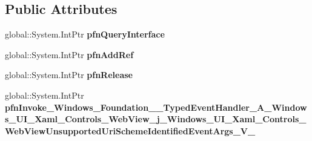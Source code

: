 \subsection*{Public Attributes}
\begin{DoxyCompactItemize}
\item 
\mbox{\label{struct_windows_1_1_foundation_1_1_typed_event_handler___a___windows___u_i___xaml___controls___we2ca8d6ce2726bd3be0205817ae158dc8_afb555e595eb9b78cb88b82047df93e94}} 
global\+::\+System.\+Int\+Ptr {\bfseries pfn\+Query\+Interface}
\item 
\mbox{\label{struct_windows_1_1_foundation_1_1_typed_event_handler___a___windows___u_i___xaml___controls___we2ca8d6ce2726bd3be0205817ae158dc8_a9399feb63f1b2ff0fb952a8736586317}} 
global\+::\+System.\+Int\+Ptr {\bfseries pfn\+Add\+Ref}
\item 
\mbox{\label{struct_windows_1_1_foundation_1_1_typed_event_handler___a___windows___u_i___xaml___controls___we2ca8d6ce2726bd3be0205817ae158dc8_acbcf840f60b1044c36b75ff25e34713b}} 
global\+::\+System.\+Int\+Ptr {\bfseries pfn\+Release}
\item 
\mbox{\label{struct_windows_1_1_foundation_1_1_typed_event_handler___a___windows___u_i___xaml___controls___we2ca8d6ce2726bd3be0205817ae158dc8_ad56f336157ca89d6d25200a9dfd1640b}} 
global\+::\+System.\+Int\+Ptr {\bfseries pfn\+Invoke\+\_\+\+Windows\+\_\+\+Foundation\+\_\+\+\_\+\+Typed\+Event\+Handler\+\_\+\+A\+\_\+\+Windows\+\_\+\+U\+I\+\_\+\+Xaml\+\_\+\+Controls\+\_\+\+Web\+View\+\_\+j\+\_\+\+Windows\+\_\+\+U\+I\+\_\+\+Xaml\+\_\+\+Controls\+\_\+\+Web\+View\+Unsupported\+Uri\+Scheme\+Identified\+Event\+Args\+\_\+\+V\+\_\+}
\end{DoxyCompactItemize}
